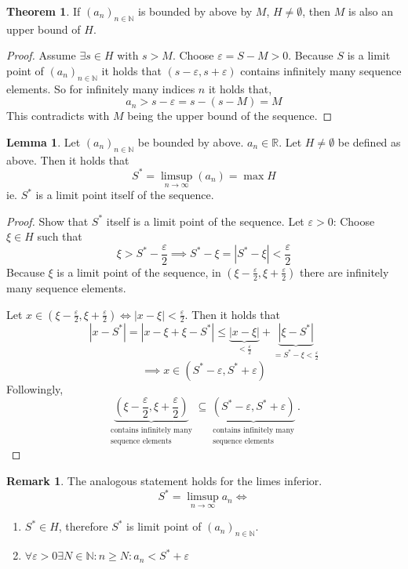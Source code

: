 \documentclass[a4paper,landscape,twocolumn]{article}
\theoremstyle{definition}
\newtheorem{theorem}{Theorem}
\newtheorem{rem}{Remark}
\newtheorem{lemma}{Lemma}
\newcommand\abs[1]{\left|#1\right|}
\newcommand\seq[1]{{\left(#1\right)}_{n \in \mathbb N}}
\begin{document}
\begin{theorem}
  If $\seq{a_n}$ is bounded by above by $M$, $H \neq \emptyset$, then $M$ is also an upper bound of $H$.
\end{theorem}
\begin{proof}
  Assume $\exists s \in H$ with $s > M$. Choose $\varepsilon = S - M > 0$.
  Because $S$ is a limit point of $\seq{a_n}$ it holds that $(s - \varepsilon, s + \varepsilon)$
  contains infinitely many sequence elements. So for infinitely many indices $n$ it holds that,
  \[ a_n > s - \varepsilon = s - (s - M) = M \]
  This contradicts with $M$ being the upper bound of the sequence.
\end{proof}

\begin{lemma}
  Let $\seq{a_n}$ be bounded by above. $a_n \in \mathbb R$. Let $H \neq \emptyset$ be defined as above.
  Then it holds that
  \[ S^* = \limsup_{n\to\infty}(a_n) = \max H \]
  ie. $S^*$ is a limit point itself of the sequence.
\end{lemma}
\begin{proof}
  Show that $S^*$ itself is a limit point of the sequence.
  Let $\varepsilon > 0$: Choose $\xi \in H$ such that
  \[ \xi > S^* - \frac\varepsilon2 \implies S^* - \xi = \abs{S^* - \xi} < \frac\varepsilon2 \]
  Because $\xi$ is a limit point of the sequence, in $(\xi - \frac\varepsilon2, \xi + \frac\varepsilon2)$
  there are infinitely many sequence elements.

  Let $x \in (\xi - \frac\varepsilon2, \xi + \frac\varepsilon2) \iff \abs{x - \xi} < \frac\varepsilon2$.
  Then it holds that
  \[
      \abs{x - S^*}
      = \abs{x - \xi + \xi - S^*}
      \leq \underbrace{\abs{x - \xi}}_{< \frac\varepsilon2} + \underbrace{\abs{\xi - S^*}}_{= S^* - \xi < \frac\varepsilon2}
  \] \[
      \implies x \in (S^* - \varepsilon, S^* + \varepsilon)
  \]
  Followingly,
  \[
    \underbrace{\left(\xi - \frac\varepsilon2, \xi + \frac\varepsilon2\right)}%
      _{\substack{\text{contains infinitely many} \\ \text{sequence elements}}}
    \subseteq \underbrace{\left(S^* - \varepsilon, S^* + \varepsilon\right)}%
      _{\substack{\text{contains infinitely many} \\ \text{sequence elements}}}.
  \]
\end{proof}

\begin{rem}
  The analogous statement holds for the limes inferior.
  \[ S^* = \limsup_{n\to\infty} a_n \iff \]
  \begin{enumerate}
    \item $S^* \in H$, therefore $S^*$ is limit point of $\seq{a_n}$.
    \item $\forall \varepsilon > 0 \exists N \in \mathbb N: n \geq N: a_n < S^* + \varepsilon$
  \end{enumerate}
\end{rem}
\end{document}
